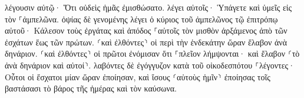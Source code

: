 \documentclass{openreader}
\begin{document}
λέγουσιν αὐτῷ· Ὅτι οὐδεὶς ἡμᾶς ἐμισθώσατο. λέγει αὐτοῖς· Ὑπάγετε καὶ ὑμεῖς εἰς τὸν ⸀ἀμπελῶνα. 
ὀψίας δὲ γενομένης λέγει ὁ κύριος τοῦ ἀμπελῶνος τῷ ἐπιτρόπῳ αὐτοῦ· Κάλεσον τοὺς ἐργάτας καὶ ἀπόδος ⸀αὐτοῖς τὸν μισθὸν ἀρξάμενος ἀπὸ τῶν ἐσχάτων ἕως τῶν πρώτων. 
⸂καὶ ἐλθόντες⸃ οἱ περὶ τὴν ἑνδεκάτην ὥραν ἔλαβον ἀνὰ δηνάριον. 
⸂καὶ ἐλθόντες⸃ οἱ πρῶτοι ἐνόμισαν ὅτι ⸀πλεῖον λήμψονται· καὶ ἔλαβον ⸂τὸ ἀνὰ δηνάριον καὶ αὐτοί⸃. 
λαβόντες δὲ ἐγόγγυζον κατὰ τοῦ οἰκοδεσπότου 
⸀λέγοντες· Οὗτοι οἱ ἔσχατοι μίαν ὥραν ἐποίησαν, καὶ ἴσους ⸂αὐτοὺς ἡμῖν⸃ ἐποίησας τοῖς βαστάσασι τὸ βάρος τῆς ἡμέρας καὶ τὸν καύσωνα. 
\end{document}
